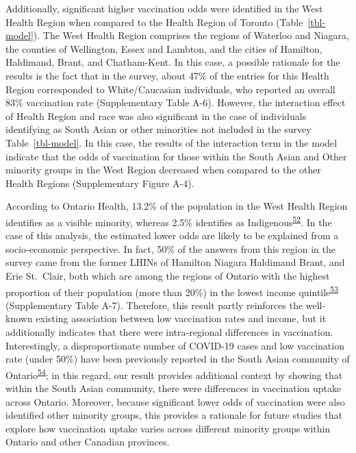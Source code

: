 \documentclass[
  letterpaper,
  DIV=11,
  numbers=noendperiod]{scrartcl}
\begin{document}
Additionally, significant higher vaccination odds were identified in the
West Health Region when compared to the Health Region of Toronto
(Table~\ref{tbl-model}). The West Health Region comprises the regions of
Waterloo and Niagara, the counties of Wellington, Essex and Lambton, and
the cities of Hamilton, Haldimand, Brant, and Chatham-Kent. In this
case, a possible rationale for the results is the fact that in the
survey, about 47\% of the entries for this Health Region corresponded to
White/Caucasian individuals, who reported an overall 83\% vaccination
rate (Supplementary Table A-6). However, the interaction effect of
Health Region and race was also significant in the case of individuals
identifying as South Asian or other minorities not included in the
survey Table~\ref{tbl-model}. In this case, the results of the
interaction term in the model indicate that the odds of vaccination for
those within the South Asian and Other minority groups in the West
Region decreased when compared to the other Health Regions
(Supplementary Figure A-4).

According to Ontario Health, 13.2\% of the population in the West Health
Region identifies as a visible minority, whereas 2.5\% identifies as
Indigenous\textsuperscript{\protect\hyperlink{ref-ontariohealth}{52}}.
In the case of this analysis, the estimated lower odds are likely to be
explained from a socio-economic perspective. In fact, 50\% of the
answers from this region in the survey came from the former LHINs of
Hamilton Niagara Haldimand Brant, and Erie St.~Clair, both which are
among the regions of Ontario with the highest proportion of their
population (more than 20\%) in the lowest income
quintile\textsuperscript{\protect\hyperlink{ref-buajitti2018}{53}}
(Supplementary Table A-7). Therefore, this result partly reinforces the
well-known existing association between low vaccination rates and
income, but it additionally indicates that there were intra-regional
differences in vaccination. Interestingly, a disproportionate number of
COVID-19 cases and low vaccination rate (under 50\%) have been
previously reported in the South Asian community of
Ontario\textsuperscript{\protect\hyperlink{ref-anand2022}{54}}; in this
regard, our result provides additional context by showing that within
the South Asian community, there were differences in vaccination uptake
across Ontario. Moreover, because significant lower odds of vaccination
were also identified other minority groups, this provides a rationale
for future studies that explore how vaccination uptake varies across
different minority groups within Ontario and other Canadian provinces.
\end{document}

